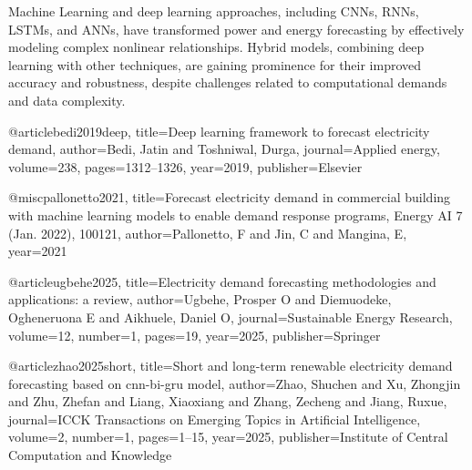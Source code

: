 Machine Learning and deep learning approaches, including CNNs, RNNs, LSTMs, and ANNs, have transformed power and energy forecasting by effectively modeling complex nonlinear relationships. Hybrid models, combining deep learning with other techniques, are gaining prominence for their improved accuracy and robustness, despite challenges related to computational demands and data complexity.




@article{bedi2019deep,
  title={Deep learning framework to forecast electricity demand},
  author={Bedi, Jatin and Toshniwal, Durga},
  journal={Applied energy},
  volume={238},
  pages={1312--1326},
  year={2019},
  publisher={Elsevier}
}


@misc{pallonetto2021,
  title={Forecast electricity demand in commercial building with machine learning models to enable demand response programs, Energy AI 7 (Jan. 2022), 100121},
  author={Pallonetto, F and Jin, C and Mangina, E},
  year={2021}
}

@article{ugbehe2025,
  title={Electricity demand forecasting methodologies and applications: a review},
  author={Ugbehe, Prosper O and Diemuodeke, Ogheneruona E and Aikhuele, Daniel O},
  journal={Sustainable Energy Research},
  volume={12},
  number={1},
  pages={19},
  year={2025},
  publisher={Springer}
}

@article{zhao2025short,
  title={Short and long-term renewable electricity demand forecasting based on cnn-bi-gru model},
  author={Zhao, Shuchen and Xu, Zhongjin and Zhu, Zhefan and Liang, Xiaoxiang and Zhang, Zecheng and Jiang, Ruxue},
  journal={ICCK Transactions on Emerging Topics in Artificial Intelligence},
  volume={2},
  number={1},
  pages={1--15},
  year={2025},
  publisher={Institute of Central Computation and Knowledge}
}